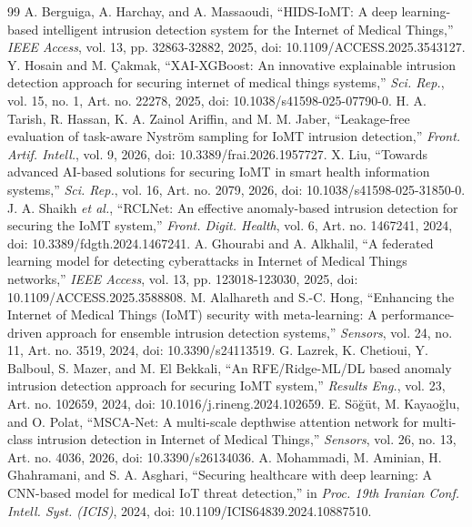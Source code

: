 \begin{thebibliography}{99}\footnotesize
{} A. Berguiga, A. Harchay, and A. Massaoudi, ``HIDS-IoMT: A deep learning-based intelligent intrusion detection system for the Internet of Medical Things,'' \textit{IEEE Access}, vol. 13, pp. 32863-32882, 2025, doi: 10.1109/ACCESS.2025.3543127.
 Y. Hosain and M. Çakmak, ``XAI-XGBoost: An innovative explainable intrusion detection approach for securing internet of medical things systems,'' \textit{Sci. Rep.}, vol. 15, no. 1, Art. no. 22278, 2025, doi: 10.1038/s41598-025-07790-0.
 H. A. Tarish, R. Hassan, K. A. Zainol Ariffin, and M. M. Jaber, ``Leakage-free evaluation of task-aware Nyström sampling for IoMT intrusion detection,'' \textit{Front. Artif. Intell.}, vol. 9, 2026, doi: 10.3389/frai.2026.1957727.
 X. Liu, ``Towards advanced AI-based solutions for securing IoMT in smart health information systems,'' \textit{Sci. Rep.}, vol. 16, Art. no. 2079, 2026, doi: 10.1038/s41598-025-31850-0.
 J. A. Shaikh \textit{et al.}, ``RCLNet: An effective anomaly-based intrusion detection for securing the IoMT system,'' \textit{Front. Digit. Health}, vol. 6, Art. no. 1467241, 2024, doi: 10.3389/fdgth.2024.1467241.
 A. Ghourabi and A. Alkhalil, ``A federated learning model for detecting cyberattacks in Internet of Medical Things networks,'' \textit{IEEE Access}, vol. 13, pp. 123018-123030, 2025, doi: 10.1109/ACCESS.2025.3588808.
 M. Alalhareth and S.-C. Hong, ``Enhancing the Internet of Medical Things (IoMT) security with meta-learning: A performance-driven approach for ensemble intrusion detection systems,'' \textit{Sensors}, vol. 24, no. 11, Art. no. 3519, 2024, doi: 10.3390/s24113519.
 G. Lazrek, K. Chetioui, Y. Balboul, S. Mazer, and M. El Bekkali, ``An RFE/Ridge-ML/DL based anomaly intrusion detection approach for securing IoMT system,'' \textit{Results Eng.}, vol. 23, Art. no. 102659, 2024, doi: 10.1016/j.rineng.2024.102659.
 E. Söğüt, M. Kayaoğlu, and O. Polat, ``MSCA-Net: A multi-scale depthwise attention network for multi-class intrusion detection in Internet of Medical Things,'' \textit{Sensors}, vol. 26, no. 13, Art. no. 4036, 2026, doi: 10.3390/s26134036.
 A. Mohammadi, M. Aminian, H. Ghahramani, and S. A. Asghari, ``Securing healthcare with deep learning: A CNN-based model for medical IoT threat detection,'' in \textit{Proc. 19th Iranian Conf. Intell. Syst. (ICIS)}, 2024, doi: 10.1109/ICIS64839.2024.10887510.

\end{thebibliography}
